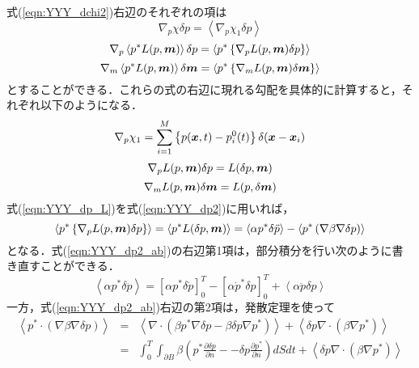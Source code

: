 式(\ref{eqn:YYY_dchi2})右辺のそれぞれの項は
\begin{equation}
	\nabla_p \chi \delta p
	=  
	\left< \nabla_p \chi_1 \delta p \right> 
	\label{eqn:YYY_dp1}
\end{equation}
\begin{equation}
	\nabla_p \left< p^*  L(p,\mbox{\boldmath $m$}) \right> \delta p
	=  
	\left< p^*  \left\{ \nabla_p L(p,\mbox{\boldmath $m$})\delta p \right\}\right> 
	\label{eqn:YYY_dp2}
\end{equation}
\begin{equation}
	\nabla_m \left< p^*  L(p,\mbox{\boldmath $m$}) \right> \delta \mbox{\boldmath $m$}
	=
	\left< p^*  \left\{ \nabla_m L(p,\mbox{\boldmath $m$}) \delta \mbox{\boldmath $m$}\right\}\right> 
	\label{eqn:YYY_dm3}
\end{equation}
とすることができる．これらの式の右辺に現れる勾配を具体的に計算すると，それぞれ以下のようになる．
\begin{equation}
	\nabla_p \chi_1 =
	\sum_{i=1}^M \left\{p(\mbox{\boldmath $x$},t)-p^0_i(t)\right\} \delta(\mbox{\boldmath $x$}-\mbox{\boldmath $x$}_i)
	\label{eqn:YYY_dm_chi1}
\end{equation}
\begin{equation}
	\nabla_p L(p,\mbox{\boldmath $m$})\delta p 
	=
	L(\delta p,\mbox{\boldmath $m$})
	\label{eqn:YYY_dp_L}
\end{equation}
\begin{equation}
	\nabla_m L(p,\mbox{\boldmath $m$})\delta \mbox{\boldmath $m$} 
	=
	L(p,\delta \mbox{\boldmath $m$})
	\label{eqn:YYY_dm_L}
\end{equation}
式(\ref{eqn:YYY_dp_L})を式(\ref{eqn:YYY_dp2})に用いれば，
\begin{equation}
	\left< p^*  \left\{ \nabla_p L(p,\mbox{\boldmath $m$})\delta p \right\} \right> 
	=
	\left< p^*  L(\delta p,\mbox{\boldmath $m$}) \right> 
	=
	\left<
		\alpha p^*\delta\ddot{p}
	\right>
	-
	\left<
		p^* \left( \nabla \beta \nabla \delta p\right)
	\right>
	\label{eqn:YYY_dp2_ab}
\end{equation}
となる．式(\ref{eqn:YYY_dp2_ab})の右辺第1項は，部分積分を行い次のように書き直すことができる．
\begin{equation}
	\left<
		\alpha p^*\delta\ddot{p}
	\right>
	=
	\left[ 
		\alpha p^* \delta \dot{p}	
	\right]_0^T
	-
	\left[ 
		\alpha \dot{p}^* \delta p	
	\right]_0^T
	+
	\left< \alpha\ddot{p} \delta p \right>
	\label{eqn:YYY_08}
\end{equation}
一方，式(\ref{eqn:YYY_dp2_ab})右辺の第2項は，発散定理を使って
\begin{eqnarray}
	\left<
		p^* \cdot \left( \nabla \beta \nabla \delta p\right)
	\right>
	&=&
	\left<
		\nabla\cdot
		\left( \beta p^*\nabla \delta p -\beta \delta p \nabla p^* \right)
	\right>
	+
	\left<
		\delta p \nabla\cdot \left( \beta \nabla p^* \right)
	\right> \\
	\label{eqn:YYY_09}
	&=&
	\int_0^T\int_{\partial B}
	\beta\left( 
		p^* \frac{\partial \delta p}{\partial n}
		-
		-\delta p \frac{\partial p^*}{\partial n}
	\right)
	dS
	dt
	+
	\left<
		\delta p \nabla\cdot \left( \beta \nabla p^* \right)
	\right>
	\label{eqn:YYY_10}
\end{eqnarray}
